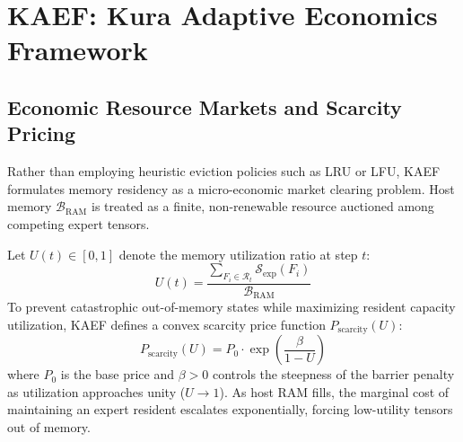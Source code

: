 \section{KAEF: Kura Adaptive Economics Framework}
\label{sec:kaef}

\subsection{Economic Resource Markets and Scarcity Pricing}
Rather than employing heuristic eviction policies such as LRU or LFU, KAEF formulates memory residency as a micro-economic market clearing problem. Host memory $\mathcal{B}_{\text{RAM}}$ is treated as a finite, non-renewable resource auctioned among competing expert tensors.

Let $U(t) \in [0, 1]$ denote the memory utilization ratio at step $t$:
\begin{equation}
    U(t) = \frac{\sum_{F_i \in \mathcal{R}_t} \mathcal{S}_{\text{exp}}(F_i)}{\mathcal{B}_{\text{RAM}}}
\end{equation}
To prevent catastrophic out-of-memory states while maximizing resident capacity utilization, KAEF defines a convex scarcity price function $P_{\text{scarcity}}(U)$:
\begin{equation}
    P_{\text{scarcity}}(U) = P_0 \cdot \exp\left( \frac{\beta}{1 - U} \right)
    \label{eq:scarcity_price}
\end{equation}
where $P_0$ is the base price and $\beta > 0$ controls the steepness of the barrier penalty as utilization approaches unity ($U \to 1$). As host RAM fills, the marginal cost of maintaining an expert resident escalates exponentially, forcing low-utility tensors out of memory.

